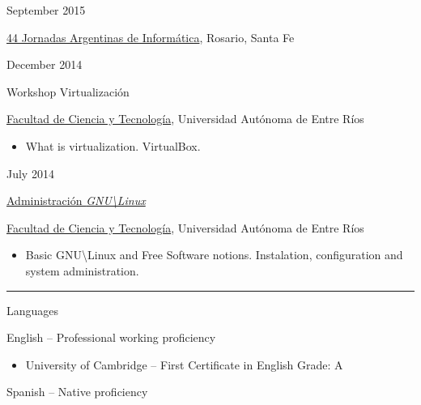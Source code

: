\documentclass[a4paper,10pt]{article}
\newlength{\cvcolumngapwidth}
\newlength{\cvleftcolumnwidth}
\newlength{\cvrightcolumnwidth}
\newcommand{\cvsectionstyle}[1]{{\normalsize\cvsectionfont\textcolor{cvsectioncolor}{#1}}}
\newcommand{\cvdurationstyle}[1]{{\small\cvdurationfont\textcolor{cvdurationcolor}{#1}}}
\newcommand{\cvheadingstyle}[1]{{\normalsize\cvheadingfont\textcolor{cvheadingcolor}{#1}}}
\newlength{\cvafteritemskipamount}
\newlength{\cvaftersectionskipamount}
\newlength{\cvbetweensectionandheadingextraskipamount}
\newlength{\cvparskip}
\newcommand{\cvsection}[1]{
    \begin{minipage}[t]{\cvleftcolumnwidth}
        \raggedleft\cvsectionstyle{#1}
    \end{minipage}%
    \hspace{\cvcolumngapwidth}%
    \begin{minipage}[t]{\cvrightcolumnwidth}
        \textcolor{cvrulecolor}{\rule{\cvrightcolumnwidth}{0.3mm}}
    \end{minipage}

    \vspace{\cvaftersectionskipamount}
}
\newcommand{\cvitem}[2]{
    \begin{minipage}[t]{\cvleftcolumnwidth}
        \raggedleft #1
    \end{minipage}%
    \hspace{\cvcolumngapwidth}%
    \begin{minipage}[t]{\cvrightcolumnwidth}
        \setlength{\parskip}{\cvparskip} #2
    \end{minipage}

    \vspace{\cvafteritemskipamount}
}
\begin{document}
\cvitem {
    \cvdurationstyle{September 2015}
}{
    \cvheadingstyle{\href{http://44jaiio.sadio.org.ar/}{44 Jornadas Argentinas de Informática}}, Rosario, Santa Fe
}
\cvitem {
    \cvdurationstyle{December 2014}
}{
    \cvheadingstyle{Workshop Virtualización}
    
    \href{https://www.gugler.com.ar/index.php}{Facultad de Ciencia y Tecnología}, Universidad Autónoma de Entre Ríos
    
    \begin{itemize}[leftmargin=*]
        \item What is virtualization. VirtualBox.
    \end{itemize}
}
\cvitem {
    \cvdurationstyle{July 2014}
}{
    \cvheadingstyle{\href{https://www.gugler.com.ar/index.php/cursos-presenciales/sistemas-operativos/administracion-gnu-linux}{Administración \textit{GNU\textbackslash Linux}}}
    
    \href{https://www.gugler.com.ar/index.php}{Facultad de Ciencia y Tecnología}, Universidad Autónoma de Entre Ríos
    
    \begin{itemize}[leftmargin=*]
        \item Basic GNU\textbackslash Linux and Free Software notions. Instalation, configuration and system administration.
    \end{itemize}
}


\cvsection{SKILLS}

\vspace{\cvbetweensectionandheadingextraskipamount}

\cvitem{
    \cvheadingstyle{Languages}
}{
    English -- Professional working proficiency
    
    \begin{itemize}
        \item University of Cambridge -- First Certificate in English \newline Grade: A
    \end{itemize}{}

    Spanish -- Native proficiency
}
\end{document}
